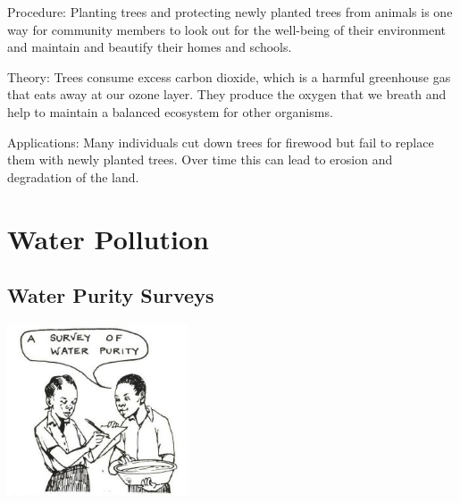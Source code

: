 \begin{multicols}{2}
\begin{description*}
\item[Procedure:]{Planting trees and protecting newly planted trees from animals is one way for community members to look out for the well-being of their environment and maintain and beautify their homes and schools.}
\item[Theory:]{Trees consume excess carbon dioxide, which is a harmful greenhouse gas that eats away at our ozone layer. They produce the oxygen that we breath and help to maintain a balanced ecosystem for other organisms. }
\item[Applications:]{Many individuals cut down trees for firewood but fail to replace them with newly planted trees. Over time this can lead to erosion and degradation of the land.}
\end{description*}

\columnbreak



\section*{Water Pollution}


\subsection{Water Purity Surveys}

\begin{center}
\includegraphics[width=0.4\textwidth]{./img/source/water-purity.jpg}
\end{center}


\end{multicols}
